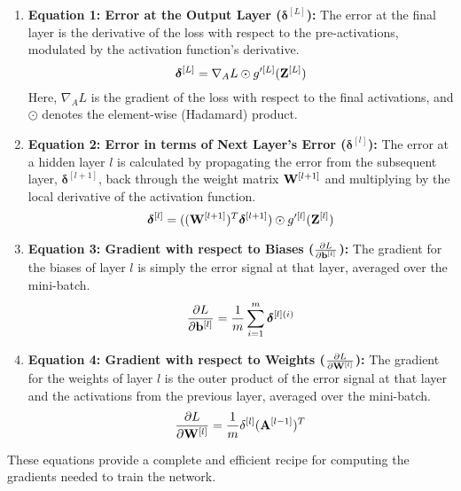 \begin{enumerate}
    \item \textbf{Equation 1: Error at the Output Layer ($\boldsymbol{\delta}^{[L]}$):} The error at the final layer is the derivative of the loss with respect to the pre-activations, modulated by the activation function's derivative.
    \begin{equation}
    \boldsymbol{\delta}^{[L]} = \nabla_A L \odot g'^{[L]}(\mathbf{Z}^{[L]})
    \end{equation}
    Here, $\nabla_A L$ is the gradient of the loss with respect to the final activations, and $\odot$ denotes the element-wise (Hadamard) product.

    \item \textbf{Equation 2: Error in terms of Next Layer's Error ($\boldsymbol{\delta}^{[l]}$):} The error at a hidden layer $l$ is calculated by propagating the error from the subsequent layer, $\boldsymbol{\delta}^{[l+1]}$, back through the weight matrix $\mathbf{W}^{[l+1]}$ and multiplying by the local derivative of the activation function.
    \begin{equation}
    \boldsymbol{\delta}^{[l]} = ((\mathbf{W}^{[l+1]})^T \boldsymbol{\delta}^{[l+1]}) \odot g'^{[l]}(\mathbf{Z}^{[l]})
    \end{equation}

    \item \textbf{Equation 3: Gradient with respect to Biases ($\frac{\partial L}{\partial \mathbf{b}^{[l]}}$):} The gradient for the biases of layer $l$ is simply the error signal at that layer, averaged over the mini-batch.
    \begin{equation}
    \frac{\partial L}{\partial \mathbf{b}^{[l]}} = \frac{1}{m} \sum_{i=1}^{m} \boldsymbol{\delta}^{[l](i)}
    \end{equation}

    \item \textbf{Equation 4: Gradient with respect to Weights ($\frac{\partial L}{\partial \mathbf{W}^{[l]}}$):} The gradient for the weights of layer $l$ is the outer product of the error signal at that layer and the activations from the previous layer, averaged over the mini-batch.
    \begin{equation}
    \frac{\partial L}{\partial \mathbf{W}^{[l]}} = \frac{1}{m} \mathbf{\delta}^{[l]} (\mathbf{A}^{[l-1]})^T
    \end{equation}
\end{enumerate}
These equations provide a complete and efficient recipe for computing the gradients needed to train the network.

